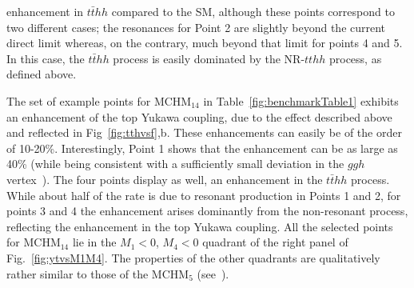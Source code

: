 enhancement in $t\bar{t}hh$ compared to the SM, although these points correspond to two different cases; the resonances for Point 2 are slightly beyond the current direct limit whereas, on the contrary, much beyond that limit for points 4 and 5. In this case, the
$t\bar{t}hh$ process is easily dominated by the NR-$tthh$ process, as
defined above.  

The set of example points for MCHM$_{14}$ in Table~\ref{fig:benchmarkTable1} exhibits an enhancement of the top Yukawa
coupling, due to the effect described above and reflected in Fig~\ref{fig:tthvsf},b.  These
enhancements can easily be of the order of 10-20\%.  Interestingly,
Point 1 shows that the enhancement can be as large as 40\% (while
being consistent with a sufficiently small deviation in the $ggh$
vertex~\cite{MCHMtthh}). The four points display as well, an enhancement
in the $t\bar{t}hh$ process.  While about half of the rate is due to
resonant production in Points 1 and 2, for points 3 and 4 the
enhancement arises dominantly from the non-resonant process,
reflecting the enhancement in the top Yukawa coupling. All the selected points for MCHM$_{14}$ lie in the
$M_1 < 0$, $M_4 < 0$ quadrant of the right panel of
Fig.~\ref{fig:ytvsM1M4}. The properties of the other quadrants are
qualitatively rather similar to those of the MCHM$_5$ (see~\cite{MCHMtthh}).

